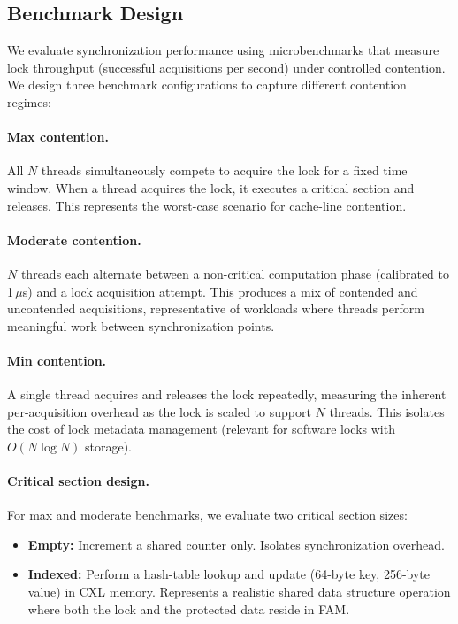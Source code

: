 \subsection{Benchmark Design}

We evaluate synchronization performance using microbenchmarks that measure lock throughput (successful acquisitions per second) under controlled contention.
We design three benchmark configurations to capture different contention regimes:

\paragraph{Max contention.}
All $N$ threads simultaneously compete to acquire the lock for a fixed time window.
When a thread acquires the lock, it executes a critical section and releases.
This represents the worst-case scenario for cache-line contention.

\paragraph{Moderate contention.}
$N$ threads each alternate between a non-critical computation phase (calibrated to 1\,$\mu$s) and a lock acquisition attempt.
This produces a mix of contended and uncontended acquisitions, representative of workloads where threads perform meaningful work between synchronization points.

\paragraph{Min contention.}
A single thread acquires and releases the lock repeatedly, measuring the inherent per-acquisition overhead as the lock is scaled to support $N$ threads.
This isolates the cost of lock metadata management (relevant for software locks with $O(N \log N)$ storage).

\paragraph{Critical section design.}
For max and moderate benchmarks, we evaluate two critical section sizes:
\begin{itemize}
    \item \textbf{Empty:} Increment a shared counter only. Isolates synchronization overhead.
    \item \textbf{Indexed:} Perform a hash-table lookup and update (64-byte key, 256-byte value) in CXL memory. Represents a realistic shared data structure operation where both the lock and the protected data reside in FAM.
\end{itemize}

